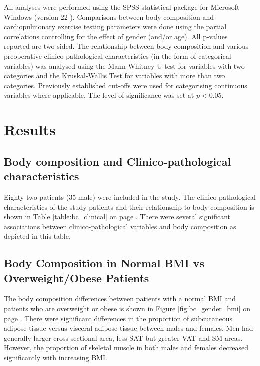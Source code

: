 All analyses were performed using the SPSS statistical package for Microsoft Windows (version 22 ). Comparisons between body composition and cardiopulmonary exercise testing parameters were done using the partial correlations controlling for the effect of gender (and/or age). All p-values reported are two-sided. The relationship between body composition and various preoperative clinico-pathological characteristics (in the form of categorical variables) was analysed using the Mann-Whitney U test for variables with two categories and the Kruskal-Wallis Test for variables with more than two categories. Previously established cut-offs were used for categorising continuous variables where applicable. The level of significance was set at $p<0.05$. 

\clearpage
\section{Results}

\subsection{Body composition and Clinico-pathological characteristics}
Eighty-two patients (35 male) were included in the study. The clinico-pathological characteristics of the study patients and their relationship to body composition is shown in Table \ref{table:bc_clinical} on page \pageref{table:bc_clinical}. There were several significant associations between clinico-pathological variables and body composition as depicted in this table.

	

\subsection{Body Composition in Normal BMI vs Overweight/Obese Patients}
The body composition differences between patients with a normal BMI and patients who are overweight or obese is shown in Figure \ref{fig:bc_gender_bmi} on page \pageref{fig:bc_gender_bmi}. There were significant differences in the proportion of subcutaneous adipose tissue versus visceral adipose tissue between males and females. Men had generally larger cross-sectional area, less SAT but greater VAT and SM areas. However, the proportion of skeletal muscle in both males and females decreased significantly with increasing BMI.

